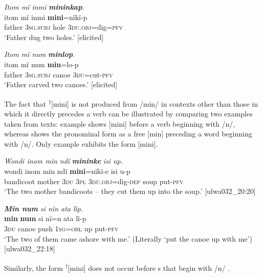 
\ea%
    \label{ex:det:43}
          \textit{Itom mï inmi} \textbf{\textit{mininkap}}.\\
\gll itom  mï      inmi  \textbf{mini}=nïkï-p\\
    father  3\textsc{sg.subj}  hole  3\textsc{du.obj}=dig=\textsc{pfv}\\
\glt `Father dug two holes.’ [elicited]
\z

\ea%
    \label{ex:det:44}
          \textit{Itom mï num} \textbf{\textit{minlop}}.\\
\gll itom  mï      num  \textbf{min}=lo-p\\
    father  3\textsc{sg.subj}  canoe  3\textsc{du}=cut-\textsc{pfv}\\
\glt `Father carved two canoes.’ [elicited]
\z


The fact that \textsuperscript{†}[mini] is not produced from /min/ in contexts other than those in which it directly precedes a verb can be illustrated by comparing two examples taken from texts: example  shows [mini] before a verb beginning with /n/, whereas  shows the pronominal form as a free  [min] preceding a word beginning with /n/. Only example  exhibits the form [mini].

\ea%
    \label{ex:det:45}
          \textit{Wondi inom min ndï} \textbf{\textit{mininke}} \textit{isi up.}\\
\gll    wondi    inom  min  ndï  \textbf{mini}=nïkï-e    isi    u-p\\
    bandicoot  mother  \textsc{3du}  3\textsc{pl}  3\textsc{du.obj}=dig{}-\textsc{dep}  soup  put-\textsc{pfv}\\
\glt `The two mother bandicoots – they cut them up into the soup.’ [ulwa032\_20:20]
\z

\ea%
    \label{ex:det:46}
          \textit{\textbf{Min num} si nïn ata lïp.}\\
\gll    \textbf{min}  \textbf{num}  si    nï=n    ata  lï-p\\
    3\textsc{du}  canoe  push  1\textsc{sg=obl}  up  put-\textsc{pfv}\\
\glt `The two of them came ashore with me.’ (Literally ‘put the canoe up with me’) [ulwa032\_22:18]
\z

Similarly, the form \textsuperscript{†}[mini] does not occur before s that begin with /n/ .


